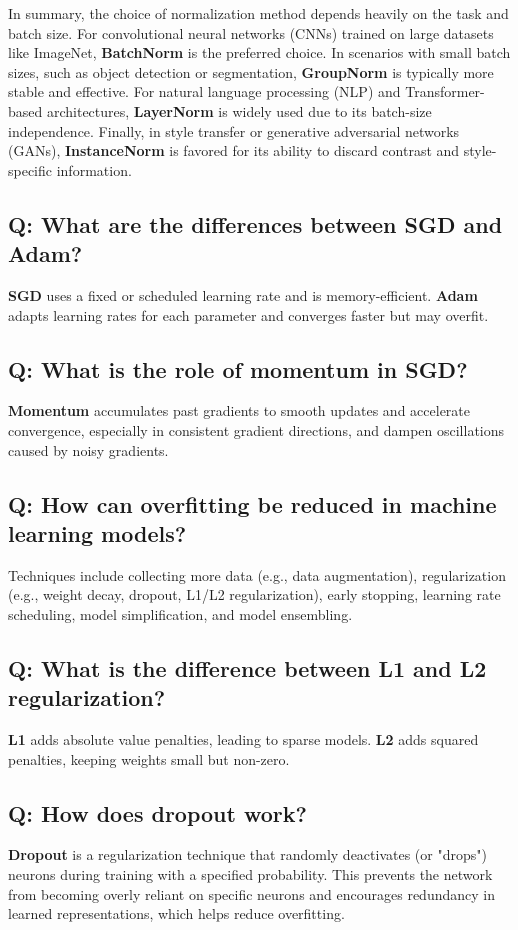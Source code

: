 In summary, the choice of normalization method depends heavily on the task and batch size. For convolutional neural networks (CNNs) trained on large datasets like ImageNet, \textbf{BatchNorm} is the preferred choice. In scenarios with small batch sizes, such as object detection or segmentation, \textbf{GroupNorm} is typically more stable and effective. For natural language processing (NLP) and Transformer-based architectures, \textbf{LayerNorm} is widely used due to its batch-size independence. Finally, in style transfer or generative adversarial networks (GANs), \textbf{InstanceNorm} is favored for its ability to discard contrast and style-specific information.

\subsection*{Q: What are the differences between SGD and Adam?}
\textbf{SGD} uses a fixed or scheduled learning rate and is memory-efficient. \textbf{Adam} adapts learning rates for each parameter and converges faster but may overfit.

\subsection*{Q: What is the role of momentum in SGD?}
\textbf{Momentum} accumulates past gradients to smooth updates and accelerate convergence, especially in consistent gradient directions, and dampen oscillations caused by noisy gradients.

\subsection*{Q: How can overfitting be reduced in machine learning models?}
Techniques include collecting more data (e.g., data augmentation), regularization (e.g., weight decay, dropout, L1/L2 regularization), early stopping, learning rate scheduling, model simplification, and model ensembling.

\subsection*{Q: What is the difference between L1 and L2 regularization?}
\textbf{L1} adds absolute value penalties, leading to sparse models. \textbf{L2} adds squared penalties, keeping weights small but non-zero.

\subsection*{Q: How does dropout work?}
\textbf{Dropout} is a regularization technique that randomly deactivates (or "drops") neurons during training with a specified probability. This prevents the network from becoming overly reliant on specific neurons and encourages redundancy in learned representations, which helps reduce overfitting.

